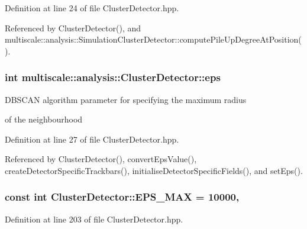 Definition at line 24 of file Cluster\-Detector.\-hpp.



Referenced by Cluster\-Detector(), and multiscale\-::analysis\-::\-Simulation\-Cluster\-Detector\-::compute\-Pile\-Up\-Degree\-At\-Position().

\hypertarget{classmultiscale_1_1analysis_1_1ClusterDetector_a61e876f87d62245eada8f56d587d39cd}{
\subsubsection[{eps}]{\setlength{\rightskip}{0pt plus 5cm}int multiscale\-::analysis\-::\-Cluster\-Detector\-::eps\hspace{0.3cm}{\ttfamily [protected]}}}\label{classmultiscale_1_1analysis_1_1ClusterDetector_a61e876f87d62245eada8f56d587d39cd}
\begin{DoxyVerb}                        DBSCAN algorithm parameter for specifying the maximum radius
\end{DoxyVerb}
 of the neighbourhood 

Definition at line 27 of file Cluster\-Detector.\-hpp.



Referenced by Cluster\-Detector(), convert\-Eps\-Value(), create\-Detector\-Specific\-Trackbars(), initialise\-Detector\-Specific\-Fields(), and set\-Eps().

\hypertarget{classmultiscale_1_1analysis_1_1ClusterDetector_a76d0b4ecd2793d478317cc1bc856e06f}{
\subsubsection[{E\-P\-S\-\_\-\-M\-A\-X}]{\setlength{\rightskip}{0pt plus 5cm}const int Cluster\-Detector\-::\-E\-P\-S\-\_\-\-M\-A\-X = 10000\hspace{0.3cm}{\ttfamily [static]}, {\ttfamily [private]}}}\label{classmultiscale_1_1analysis_1_1ClusterDetector_a76d0b4ecd2793d478317cc1bc856e06f}


Definition at line 203 of file Cluster\-Detector.\-hpp.




